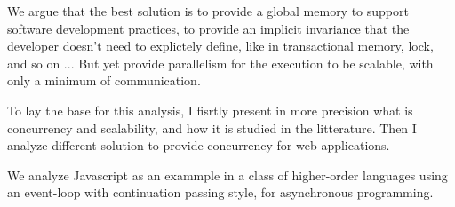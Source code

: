 We argue that the best solution is to provide a global memory to support software development practices, to provide an implicit invariance that the developer doesn't need to explictely define, like in transactional memory, lock, and so on ...
But yet provide parallelism for the execution to be scalable, with only a minimum of communication.

To lay the base for this analysis, I fisrtly present in more precision what is concurrency and scalability, and how it is studied in the litterature.
Then I analyze different solution to provide concurrency for web-applications.


We analyze Javascript as an exammple in a class of higher-order languages using an event-loop with continuation passing style, for asynchronous programming.


% 
% 
% 



